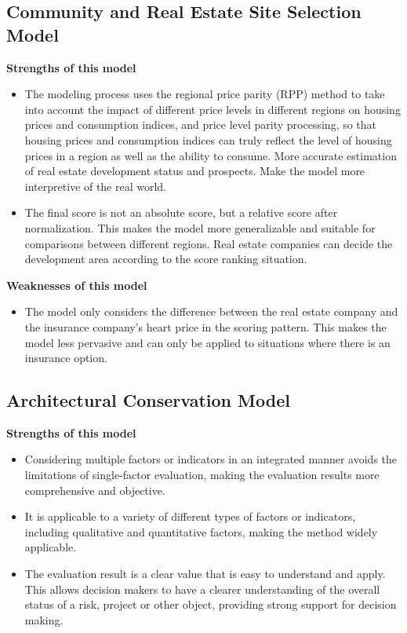 \documentclass[12pt]{article}  %
\begin{document}
\subsection{Community and Real Estate Site Selection Model}
\textbf{Strengths of this model}
\begin{itemize}
    \item The modeling process uses the regional price parity (RPP) method to take into account the impact of different price levels in different regions on housing prices and consumption indices, and price level parity processing, so that housing prices and consumption indices can truly reflect the level of housing prices in a region as well as the ability to consume. More accurate estimation of real estate development status and prospects. Make the model more interpretive of the real world.
    \item The final score is not an absolute score, but a relative score after normalization. This makes the model more generalizable and suitable for comparisons between different regions. Real estate companies can decide the development area according to the score ranking situation.
\end{itemize}

\textbf{Weaknesses of this model}
\begin{itemize}
    \item The model only considers the difference between the real estate company and the insurance company's heart price in the scoring pattern. This makes the model less pervasive and can only be applied to situations where there is an insurance option.
 \end{itemize}

\subsection{Architectural Conservation Model}
\textbf{Strengths of this model}
\begin{itemize}
    \item Considering multiple factors or indicators in an integrated manner avoids the limitations of single-factor evaluation, making the evaluation results more comprehensive and objective.
    \item It is applicable to a variety of different types of factors or indicators, including qualitative and quantitative factors, making the method widely applicable.
    \item The evaluation result is a clear value that is easy to understand and apply. This allows decision makers to have a clearer understanding of the overall status of a risk, project or other object, providing strong support for decision making.
\end{itemize}
\end{document}
